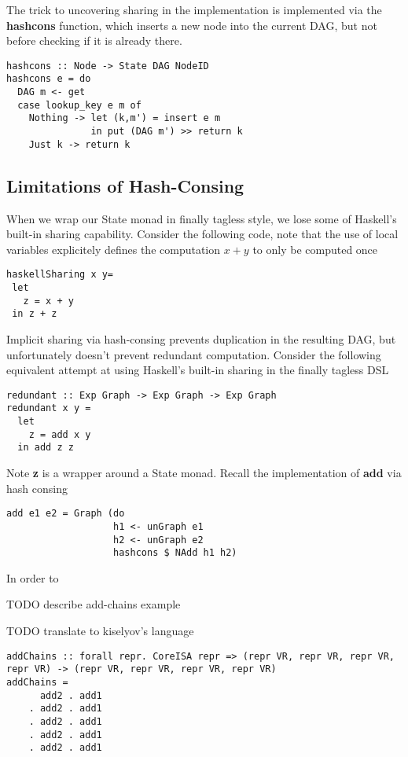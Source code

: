\documentclass[runningheads]{llncs}
\begin{document}
The trick to uncovering sharing in the implementation is implemented via the
{\bf hashcons} function, which inserts a new node into the current DAG, but not
before checking if it is already there.
\begin{verbatim}
hashcons :: Node -> State DAG NodeID
hashcons e = do
  DAG m <- get
  case lookup_key e m of
    Nothing -> let (k,m') = insert e m
               in put (DAG m') >> return k
    Just k -> return k
\end{verbatim}

\subsection{Limitations of Hash-Consing}

When we wrap our State monad in finally tagless style, we lose some of Haskell's
built-in sharing capability. Consider the following code, note that the use of
local variables explicitely defines the computation $x + y$ to only be computed
once
\begin{verbatim}
haskellSharing x y=
 let
   z = x + y
 in z + z
\end{verbatim}

Implicit sharing via hash-consing prevents duplication in the resulting DAG, but
unfortunately doesn't prevent redundant computation. Consider the following
equivalent attempt at using Haskell's built-in sharing in the finally tagless DSL
\begin{verbatim}
redundant :: Exp Graph -> Exp Graph -> Exp Graph
redundant x y =
  let
    z = add x y
  in add z z
\end{verbatim}
Note {\bf z} is a wrapper around a State monad. Recall the implementation of
{\bf add} via hash consing
\begin{verbatim}
add e1 e2 = Graph (do
                   h1 <- unGraph e1
                   h2 <- unGraph e2
                   hashcons $ NAdd h1 h2)
\end{verbatim}
In order to

TODO describe add-chains example

TODO translate to kiselyov's language
\begin{verbatim}
addChains :: forall repr. CoreISA repr => (repr VR, repr VR, repr VR, repr VR) -> (repr VR, repr VR, repr VR, repr VR)
addChains =
      add2 . add1
    . add2 . add1
    . add2 . add1
    . add2 . add1
    . add2 . add1
\end{verbatim}
\end{document}
